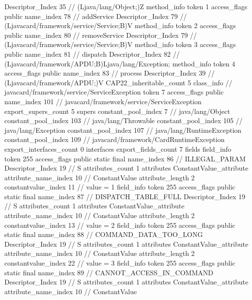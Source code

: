 {{{{{					Descriptor_Index	35		// (Ljava/lang/Object;)Z
				}
				method_info {
					token	1
					access_flags	public
					name_index	78		// addService
					Descriptor_Index	79		// (Ljavacard/framework/service/Service;B)V
				}
				method_info {
					token	2
					access_flags	public
					name_index	80		// removeService
					Descriptor_Index	79		// (Ljavacard/framework/service/Service;B)V
				}
				method_info {
					token	3
					access_flags	public
					name_index	81		// dispatch
					Descriptor_Index	82		// (Ljavacard/framework/APDU;B)Ljava/lang/Exception;
				}
				method_info {
					token	4
					access_flags	public
					name_index	83		// process
					Descriptor_Index	39		// (Ljavacard/framework/APDU;)V
				}
			}
			CAP22_inheritable_count	5
		}
		class_info {		// javacard/framework/service/ServiceException
			token	7
			access_flags	public
			name_index	101		// javacard/framework/service/ServiceException
			export_supers_count	5
			supers {
				constant_pool_index	7		// java/lang/Object
				constant_pool_index	103		// java/lang/Throwable
				constant_pool_index	105		// java/lang/Exception
				constant_pool_index	107		// java/lang/RuntimeException
				constant_pool_index	109		// javacard/framework/CardRuntimeException
			}
			export_interfaces_count	0
			interfaces {
			}
			export_fields_count	7
			fields {
			field_info {
				token	255
				access_flags	public static final
				name_index	86		// ILLEGAL_PARAM
				Descriptor_Index	19		// S
				attributes_count	1
				attributes {
				ConstantValue_attribute {
					attribute_name_index	10		// ConstantValue
					attribute_length	2
					constantvalue_index	11		// value = 1
				}
				}
			}
			field_info {
				token	255
				access_flags	public static final
				name_index	87		// DISPATCH_TABLE_FULL
				Descriptor_Index	19		// S
				attributes_count	1
				attributes {
				ConstantValue_attribute {
					attribute_name_index	10		// ConstantValue
					attribute_length	2
					constantvalue_index	13		// value = 2
				}
				}
			}
			field_info {
				token	255
				access_flags	public static final
				name_index	88		// COMMAND_DATA_TOO_LONG
				Descriptor_Index	19		// S
				attributes_count	1
				attributes {
				ConstantValue_attribute {
					attribute_name_index	10		// ConstantValue
					attribute_length	2
					constantvalue_index	22		// value = 3
				}
				}
			}
			field_info {
				token	255
				access_flags	public static final
				name_index	89		// CANNOT_ACCESS_IN_COMMAND
				Descriptor_Index	19		// S
				attributes_count	1
				attributes {
				ConstantValue_attribute {
					attribute_name_index	10		// ConstantValue
}}}}}}}
